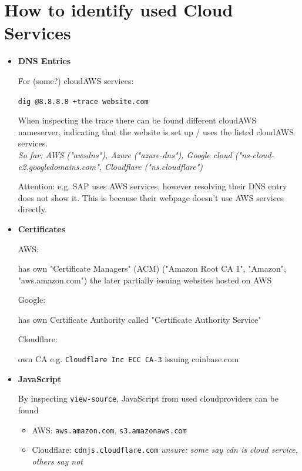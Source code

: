 \documentclass[12pt]{article}
\begin{document}
\section*{How to identify used Cloud Services}
\begin{itemize}
    \item \textbf{DNS Entries}
    
    For (some?) cloudAWS services:
    
    \verb|dig @8.8.8.8 +trace website.com|
    
    When inspecting the trace there can be found different cloudAWS nameserver, indicating that the website is set up / uses the listed cloudAWS services. \\
    \textit{So far: AWS ("awsdns"), Azure ("azure-dns"), Google cloud ("ns-cloud-c2.googledomains.com", Cloudflare ("ns.cloudflare")}
    
    Attention: e.g. SAP uses AWS services, however resolving their DNS entry does not show it. This is because their webpage doesn't use AWS services directly.
    
    
    \item \textbf{Certificates}
    
    AWS: 
    
    has own "Certificate Managers" (ACM) ("Amazon Root CA 1", "Amazon", "aws.amazon.com") the later partially issuing websites hosted on AWS
    
    Google: 
    
    has own Certificate Authority called "Certificate Authority Service" 
    
    Cloudflare: 
    
    own CA e.g. \verb|Cloudflare Inc ECC CA-3| issuing coinbase.com
    
    \item \textbf{JavaScript}
    
    By inspecting \verb|view-source|, JavaScript from used cloudproviders can be found
    \begin{itemize}
        \item AWS: \verb|aws.amazon.com|, \verb|s3.amazonaws.com|
        \item Cloudflare:
        \verb|cdnjs.cloudflare.com| \textit{unsure: some say cdn is cloud service, others say not}
    \end{itemize}
\end{itemize}
\end{document}
